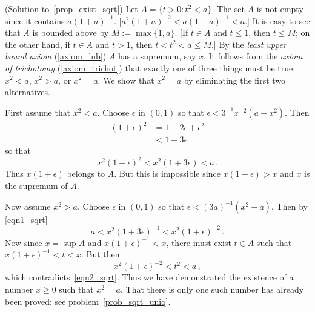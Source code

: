 \begin{prf}\label{sol_prop_exist_sqrt}(Solution to~\ref{prop_exist_sqrt})
Let $A = \{t > 0 \colon t^2 < a\}$. The set $A$ is not empty since it contains $a(1 +
a)^{-1}$. [$a^2(1 + a)^{-2} < a(1 + a)^{-1} < a$.]  It is easy to see that $A$ is bounded
above by $M := \max\{1,a\}$.  [If $t \in A$ and $t \le 1$, then $t \le M$; on the other hand,
if $t \in A$ and $t > 1$, then $t < t^2 < a \le M$.]  By the \emph{least upper bound axiom}
(\ref{axiom_lub}) $A$ has a supremum, say $x$. It follows from the \emph{axiom of trichotomy}
(\ref{axiom_trichot}) that exactly one of three things must be true: $x^2 < a$, $x^2 > a$, or
$x^2 = a$.  We show that $x^2 = a$ by eliminating the first two alternatives.

First assume that $x^2 < a$.  Choose $\epsilon$ in $(0,1)$ so that $\epsilon < 3^{-1}x^{-2}(a
- x^2)$. Then
  \begin{align}\label{eqn1_sqrt}
       (1 + \epsilon)^2 &= 1 + 2\epsilon + \epsilon^2 \\
                        &< 1 + 3\epsilon
  \end{align}
so that
  \[ x^2(1 + \epsilon)^2 < x^2(1 + 3\epsilon) < a\,. \]
Thus $x(1 + \epsilon)$ belongs to $A$. But this is impossible since $x(1 + \epsilon) > x$ and
$x$ is the supremum of $A$.

Now assume $x^2 > a$. Choose $\epsilon$ in $(0,1)$ so that $\epsilon < (3a)^{-1}(x^2 - a)$.
Then by \eqref{eqn1_sqrt}
  \begin{equation}\label{eqn2_sqrt}
        a < x^2(1 + 3\epsilon)^{-1} < x^2(1 + \epsilon)^{-2}\,.
  \end{equation}
Now since $x = \sup A$ and $x(1 + \epsilon)^{-1} < x$, there must exist $t \in A$ such that
$x(1 + \epsilon)^{-1} < t < x$. But then
  \[ x^2(1 + \epsilon)^{-2} < t^2 < a\,, \]
which contradicts~\eqref{eqn2_sqrt}. Thus we have demonstrated the existence of a number $x
\ge 0$ such that $x^2 = a$.  That there is only one such number has already been proved: see
problem~\ref{prob_sqrt_uniq}.
\end{prf}



























